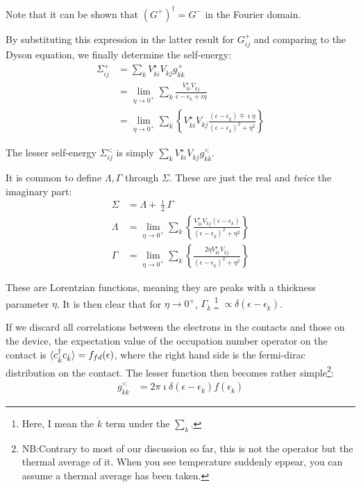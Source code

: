 Note that it can be shown that $(G^+)^\dagger=G^-$ in the Fourier domain.

By substituting this expression in the latter result for $G_{ij}^+$ and comparing to the Dyson equation, we finally determine the self-energy:
\begin{align*}
\Sigma_{ij}^+ &= \sum_{\dot{k}} V_{\dot{k}i}^\star V_{\dot{k}j} g_{\dot{k}\dot{k}}^+ \\
&= \lim_{\eta\rightarrow 0^+} \sum_{\dot{k}}\frac{ V_{\dot{k}i}^\star V_{\dot{k}j}}{\epsilon-\epsilon_{\dot{k}} + i\eta} \\
&= \lim_{\eta\rightarrow 0^+}\sum_{\dot{k}} \left\{V_{\dot{k}i}^\star V_{\dot{k}j} \frac{ \left(\epsilon-\epsilon_{\dot{k}}\right) \mp \imath \eta}{  \left(\epsilon-\epsilon_{\dot{k}}\right)^2 + \eta^2}\right\}
\end{align*} 

The lesser self-energy $\Sigma^<_{ij}$ is simply $\sum_{\dot{k}} V_{\dot{k}i}^\star V_{\dot{k}j} g_{\dot{k}\dot{k}}^<$.

It is common to define  $\Lambda, \Gamma$ through $\Sigma$. These are just the real and \emph{twice} the imaginary part:
\begin{align*}
\Sigma &= \Lambda + \frac{\imath}{2} \Gamma \\
\Lambda &=  \lim_{\eta\rightarrow 0^+}\sum_{\dot{k}} \left\{ \frac{V_{\dot{k}i}^\star V_{\dot{k}j} \left(\epsilon-\epsilon_{\dot{k}}\right)}{  \left(\epsilon-\epsilon_{\dot{k}}\right)^2 + \eta^2}\right\} \\
\Gamma &= 
\lim_{\eta\rightarrow 0^+}\sum_{\dot{k}} \left\{ \frac{2 \eta V_{\dot{k}i}^\star V_{\dot{k}j}}{  \left(\epsilon-\epsilon_{\dot{k}}\right)^2 + \eta^2}\right\}
\end{align*}

These are Lorentzian functions, meaning they are peaks with a thickness parameter $\eta$. It is then clear that for $\eta\rightarrow 0^+$, $\Gamma_{\dot{k}}$ \footnote{Here, I mean the $\dot{k}$ term under the $\sum_{\dot{k}}$.} $\propto \delta(\epsilon-\epsilon_{\dot{k}})$. 

If we discard all correlations between the electrons in the contacts and those on the device, the expectation value of the occupation number operator on the contact is $\braket{c_{\dot{k}}^\dagger c_{\dot{k}}}=f_{fd}(\epsilon)$, where the right hand side is the fermi-dirac distribution on the contact. The lesser function then becomes rather simple\footnote{NB:Contrary to most of our discussion so far, this is not the operator but the thermal average of it. When you see temperature suddenly eppear, you can assume a thermal average has been taken.}:
\begin{align*}
g^<_{\dot{k}\dot{k}} &= 2\pi\imath \delta(\epsilon-\epsilon_{\dot{k}}) f(\epsilon_{\dot{k}})
\end{align*}

